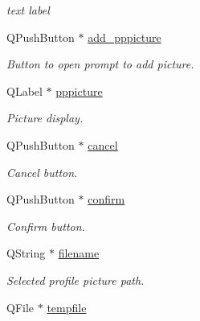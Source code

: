 \begin{DoxyCompactItemize}
\begin{DoxyCompactList}\small\item\em text label \end{DoxyCompactList}\item 
\hypertarget{classregisterWidget_a4cb9ac48cf6ad4136bd953e8479a74c2}{Q\-Push\-Button $\ast$ \hyperlink{classregisterWidget_a4cb9ac48cf6ad4136bd953e8479a74c2}{add\-\_\-pppicture}}\label{classregisterWidget_a4cb9ac48cf6ad4136bd953e8479a74c2}

\begin{DoxyCompactList}\small\item\em Button to open prompt to add picture. \end{DoxyCompactList}\item 
\hypertarget{classregisterWidget_a7aebfab8b880f9e7af34096679a037ee}{Q\-Label $\ast$ \hyperlink{classregisterWidget_a7aebfab8b880f9e7af34096679a037ee}{pppicture}}\label{classregisterWidget_a7aebfab8b880f9e7af34096679a037ee}

\begin{DoxyCompactList}\small\item\em Picture display. \end{DoxyCompactList}\item 
\hypertarget{classregisterWidget_a3642d8e5b279b0bbebe27dc4123c045a}{Q\-Push\-Button $\ast$ \hyperlink{classregisterWidget_a3642d8e5b279b0bbebe27dc4123c045a}{cancel}}\label{classregisterWidget_a3642d8e5b279b0bbebe27dc4123c045a}

\begin{DoxyCompactList}\small\item\em Cancel button. \end{DoxyCompactList}\item 
\hypertarget{classregisterWidget_ad4ad3b5631639eb7f47dc82853f56bc8}{Q\-Push\-Button $\ast$ \hyperlink{classregisterWidget_ad4ad3b5631639eb7f47dc82853f56bc8}{confirm}}\label{classregisterWidget_ad4ad3b5631639eb7f47dc82853f56bc8}

\begin{DoxyCompactList}\small\item\em Confirm button. \end{DoxyCompactList}\item 
\hypertarget{classregisterWidget_aa10ee76c7b26e5aadef01ab72a4b0c79}{Q\-String $\ast$ \hyperlink{classregisterWidget_aa10ee76c7b26e5aadef01ab72a4b0c79}{filename}}\label{classregisterWidget_aa10ee76c7b26e5aadef01ab72a4b0c79}

\begin{DoxyCompactList}\small\item\em Selected profile picture path. \end{DoxyCompactList}\item 
\hypertarget{classregisterWidget_a9e25b3b015d4a4fed065f626c5f16998}{Q\-File $\ast$ \hyperlink{classregisterWidget_a9e25b3b015d4a4fed065f626c5f16998}{tempfile}}\label{classregisterWidget_a9e25b3b015d4a4fed065f626c5f16998}


\end{DoxyCompactItemize}
